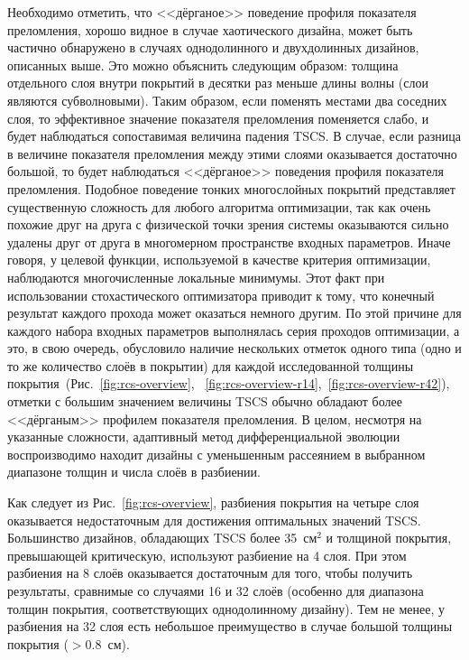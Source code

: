 Необходимо отметить, что <<дёрганое>> поведение профиля показателя
преломления, хорошо видное в случае хаотического дизайна, может быть
частично обнаружено в случаях однодолинного и двухдолинных дизайнов,
описанных выше.  Это можно объяснить следующим образом: толщина
отдельного слоя внутри покрытий в десятки раз меньше длины волны (слои
являются субволновыми).  Таким образом, если поменять местами два
соседних слоя, то эффективное значение показателя преломления
поменяется слабо, и будет наблюдаться сопоставимая величина падения
TSCS.  В случае, если разница в величине показателя преломления между
этими слоями оказывается достаточно большой, то будет наблюдаться
<<дёрганое>> поведения профиля показателя преломления.  Подобное
поведение тонких многослойных покрытий представляет
существенную сложность для любого алгоритма оптимизации, так как очень
похожие друг на друга с физической точки зрения системы оказываются
сильно удалены друг от друга в многомерном пространстве входных
параметров.  Иначе говоря, у целевой функции, используемой в качестве
критерия оптимизации, наблюдаются многочисленные локальные
минимумы.  Этот факт при использовании стохастического оптимизатора
приводит к тому, что конечный результат каждого прохода может
оказаться немного другим.  По этой причине для каждого набора входных
параметров выполнялась серия проходов оптимизации, а это, в свою
очередь, обусловило наличие нескольких отметок одного типа
(одно и то же количество слоёв в покрытии) для каждой исследованной
толщины покрытия~(Рис.~\ref{fig:rcs-overview},%
~\ref{fig:rcs-overview-r14},~\ref{fig:rcs-overview-r42}), отметки с
большим значением величины TSCS обычно обладают более <<дёрганым>>
профилем показателя преломления.  В целом, несмотря на указанные
сложности, адаптивный метод дифференциальной эволюции воспроизводимо
находит дизайны  с уменьшенным рассеянием в выбранном диапазоне толщин
и числа слоёв в разбиении.

Как следует из Рис.~\ref{fig:rcs-overview}, разбиения покрытия на
четыре слоя оказывается недостаточным для достижения оптимальных
значений TSCS.  Большинство дизайнов, обладающих TSCS более 35~см$^2$ и
толщиной покрытия, превышающей критическую, используют разбиение на 4
слоя.  При этом разбиения на 8 слоёв оказывается достаточным для того,
чтобы получить результаты, сравнимые со случаями 16 и 32 слоёв
(особенно для диапазона толщин покрытия, соответствующих однодолинному
дизайну).  Тем не менее, у разбиения на 32 слоя есть небольшое
преимущество в случае большой толщины покрытия (${> 0.8}$~см).

